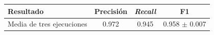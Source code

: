 \begin{tabular}{lccc}
\toprule
\textbf{Resultado} & \textbf{Precisión} & \textbf{\textit{Recall}} & \textbf{F1} \\
\midrule
Media de tres ejecuciones & \num{0.972} & \num{0.945} & \num{0.958} $\pm$ \num{0.007} \\
\bottomrule
\end{tabular}
